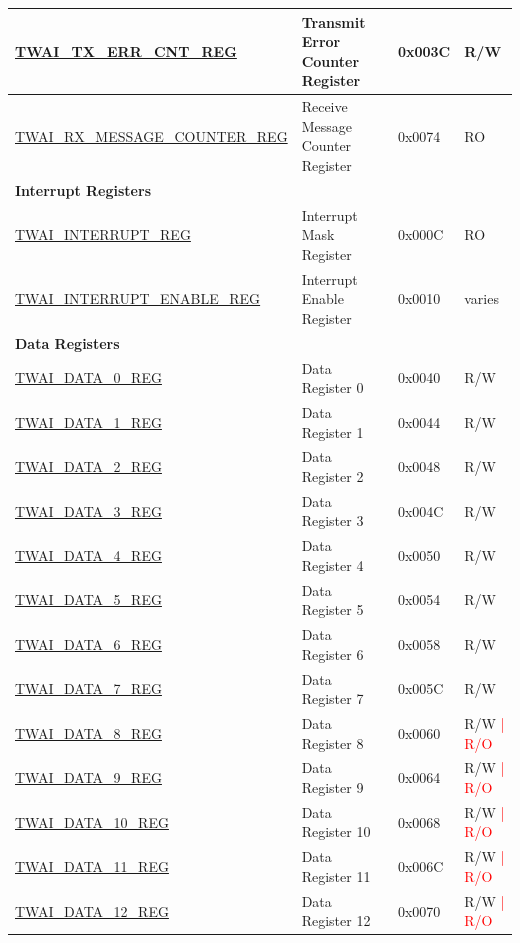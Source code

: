 \begin{longtable}{ | p{6cm} | p{6.2cm} | p{1.3cm} | p{1.5cm} | }
\hyperref[regdesc:TWAITXERRCNTREG]{TWAI\_TX\_ERR\_CNT\_REG} & Transmit Error Counter Register & 0x003C & R/W \\ \hline
\hyperref[regdesc:TWAIRXMESSAGECOUNTERREG]{TWAI\_RX\_MESSAGE\_COUNTER\_REG} & Receive Message Counter Register & 0x0074 & RO \\ \hline
\multicolumn{4}{|l|}{\textbf{Interrupt Registers}} \\ \hline
\hyperref[regdesc:TWAIINTERRUPTREG]{TWAI\_INTERRUPT\_REG} & Interrupt Mask Register & 0x000C & RO \\ \hline
\hyperref[regdesc:TWAIINTERRUPTENABLEREG]{TWAI\_INTERRUPT\_ENABLE\_REG} & Interrupt Enable Register & 0x0010 & varies \\ \hline
\multicolumn{4}{|l|}{\textbf{Data Registers}} \\ \hline
\hyperref[regdesc:TWAIDATA0REG]{TWAI\_DATA\_0\_REG} & Data Register 0 & 0x0040 & R/W \\ \hline
\hyperref[regdesc:TWAIDATA1REG]{TWAI\_DATA\_1\_REG} & Data Register 1 & 0x0044 & R/W \\ \hline
\hyperref[regdesc:TWAIDATA2REG]{TWAI\_DATA\_2\_REG} & Data Register 2 & 0x0048 & R/W \\ \hline
\hyperref[regdesc:TWAIDATA3REG]{TWAI\_DATA\_3\_REG} & Data Register 3 & 0x004C & R/W \\ \hline
\hyperref[regdesc:TWAIDATA4REG]{TWAI\_DATA\_4\_REG} & Data Register 4 & 0x0050 & R/W \\ \hline
\hyperref[regdesc:TWAIDATA5REG]{TWAI\_DATA\_5\_REG} & Data Register 5 & 0x0054 & R/W \\ \hline
\hyperref[regdesc:TWAIDATA6REG]{TWAI\_DATA\_6\_REG} & Data Register 6 & 0x0058 & R/W \\ \hline
\hyperref[regdesc:TWAIDATA7REG]{TWAI\_DATA\_7\_REG} & Data Register 7 & 0x005C & R/W \\ \hline
\hyperref[regdesc:TWAIDATA8REG]{TWAI\_DATA\_8\_REG} & Data Register 8 & 0x0060 & R/W \textcolor{red}{| R/O} \\ \hline
\hyperref[regdesc:TWAIDATA9REG]{TWAI\_DATA\_9\_REG} & Data Register 9 & 0x0064 & R/W \textcolor{red}{| R/O} \\ \hline
\hyperref[regdesc:TWAIDATA10REG]{TWAI\_DATA\_10\_REG} & Data Register 10 & 0x0068 & R/W \textcolor{red}{| R/O} \\ \hline
\hyperref[regdesc:TWAIDATA11REG]{TWAI\_DATA\_11\_REG} & Data Register 11 & 0x006C & R/W \textcolor{red}{| R/O} \\ \hline
\hyperref[regdesc:TWAIDATA12REG]{TWAI\_DATA\_12\_REG} & Data Register 12 & 0x0070 & R/W \textcolor{red}{| R/O} \\ \hline

\end{longtable}

